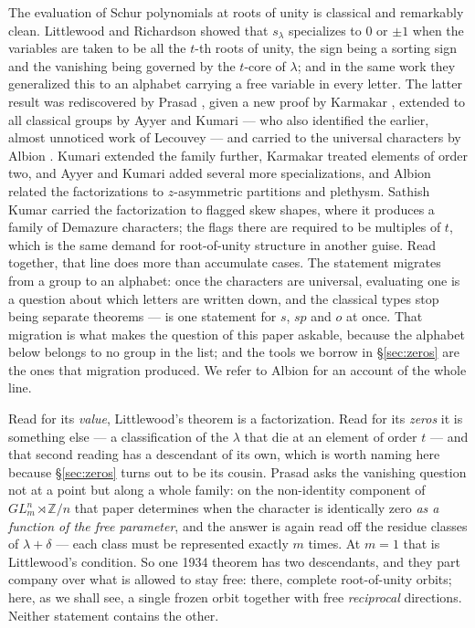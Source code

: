 \documentclass[11pt,reqno]{amsart}
\theoremstyle{plain}
\theoremstyle{definition}
\newcommand{\ZZ}{\mathbb{Z}}
\begin{document}
The evaluation of Schur polynomials at roots of unity is classical and remarkably clean. Littlewood
and Richardson \cite{LR34} showed that $s_\lambda$ specializes to $0$ or $\pm1$ when the variables
are taken to be all the $t$-th roots of unity, the sign being a sorting sign and the vanishing being
governed by the $t$-core of $\lambda$; and in the same work they generalized this to an alphabet
carrying a free variable in every letter. The latter result was rediscovered by Prasad \cite{Pra16},
given a new proof by Karmakar \cite{Kar22}, extended to all classical groups by Ayyer and Kumari
\cite{AK22} --- who also identified the earlier, almost unnoticed work of Lecouvey \cite{Lec09} ---
and carried to the universal characters by Albion \cite{Alb23}. Kumari \cite{Kum24} extended the
family further, Karmakar \cite{Kar24} treated elements of order two, and Ayyer and Kumari
\cite{AK25} added several more specializations, and Albion \cite{Alb25} related the factorizations to
$z$-asymmetric partitions and plethysm. Sathish Kumar \cite{SK23} carried the factorization to
flagged skew shapes, where it produces a family of Demazure characters; the flags there are
required to be multiples of $t$, which is the same demand for root-of-unity structure in another
guise. Read together, that line does more than accumulate cases. The statement migrates from a group
to an alphabet: once the characters are universal, evaluating one is a question about which letters
are written down, and the classical types stop being separate theorems --- \cite[Theorem 5.3]{AK25}
is one statement for $s$, $sp$ and $o$ at once. That migration is what makes the question of this
paper askable, because the alphabet below belongs to no group in the list; and the tools we borrow in
\S\ref{sec:zeros} are the ones that migration produced. We refer to Albion \cite{Alb23} for an
account of the whole line.

Read for its \emph{value}, Littlewood's theorem is a factorization. Read for its \emph{zeros} it is
something else --- a classification of the $\lambda$ that die at an element of order $t$ --- and
that second reading has a descendant of its own, which is worth naming here because
\S\ref{sec:zeros} turns out to be its cousin. Prasad \cite[Theorem 2]{Pra16} asks the vanishing
question not at a point but along a whole family: on the non-identity component of
$GL_m^n\rtimes\ZZ/n$ that paper determines when the character is identically zero \emph{as a function of the
free parameter}, and the answer is again read off the residue classes of $\lambda+\delta$ --- each
class must be represented exactly $m$ times. At $m=1$ that is Littlewood's condition. So one 1934
theorem has two descendants, and they part company over what is allowed to stay free: there,
complete root-of-unity orbits; here, as we shall see, a single frozen orbit together with free
\emph{reciprocal} directions. Neither statement contains the other.
\end{document}
